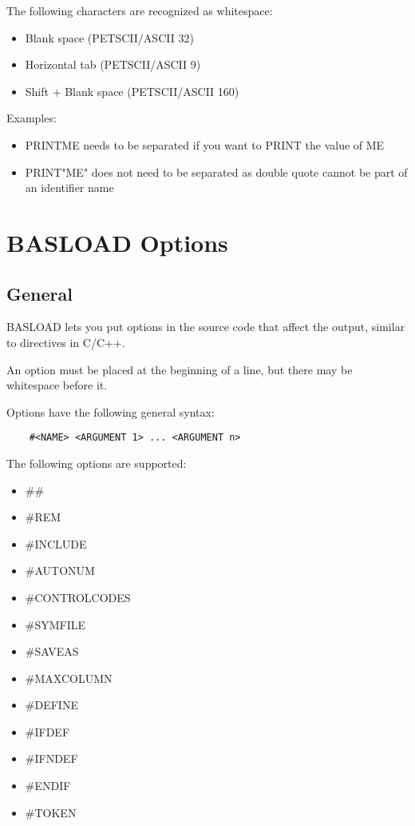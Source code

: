 \documentclass{article}
\begin{document}
        The following characters are recognized as whitespace:

        \begin{itemize}
            \item Blank space (PETSCII/ASCII 32)
            \item Horizontal tab (PETSCII/ASCII 9)
            \item Shift + Blank space (PETSCII/ASCII 160)
        \end{itemize}

        Examples:

        \begin{itemize}
            \item PRINTME needs to be separated if you want to PRINT the value of ME
            \item PRINT"ME" does not need to be separated as double quote cannot be part of an identifier name
        \end{itemize}

\section{BASLOAD Options}

    \subsection{General}

        BASLOAD lets you put options in the source code that affect the output, similar to
        directives in C/C++.

        An option must be placed at the beginning of a line, but there may be
        whitespace before it.

        Options have the following general syntax:

        \begin{verbatim}
    #<NAME> <ARGUMENT 1> ... <ARGUMENT n>
        \end{verbatim}

        The following options are supported:

        \begin{itemize}
            \item \#\#
            \item \#REM
            \item \#INCLUDE
            \item \#AUTONUM
            \item \#CONTROLCODES
            \item \#SYMFILE
            \item \#SAVEAS
            \item \#MAXCOLUMN
            \item \#DEFINE
            \item \#IFDEF
            \item \#IFNDEF
            \item \#ENDIF
            \item \#TOKEN
        \end{itemize}
\end{document}
